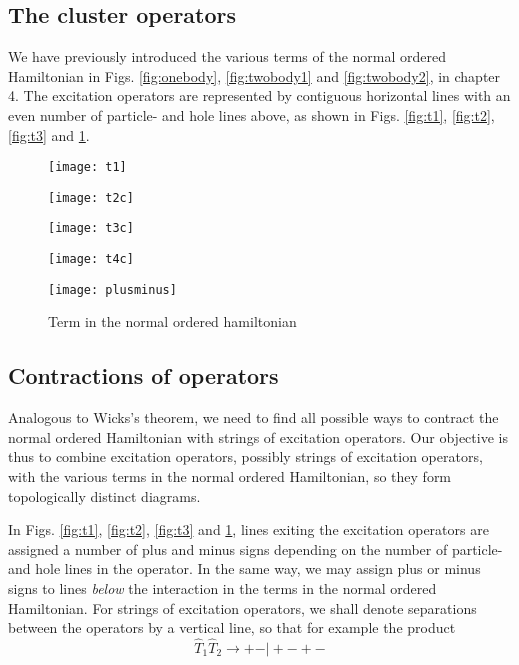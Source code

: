 \subsection{The cluster operators}

We have previously introduced the various terms of the normal ordered
Hamiltonian in Figs. \ref{fig:onebody}, \ref{fig:twobody1} and
\ref{fig:twobody2}, in chapter 4. The excitation operators are
represented by contiguous horizontal lines with an even number of
particle- and hole lines above, as shown in Figs. \ref{fig:t1},
\ref{fig:t2}, \ref{fig:t3} and \ref{fig:t4}.
\begin{figure}[!htb]
  \centering
  \texttt{[image: t1]}
  \caption{}\label{fig:t1}
\endminipage\hfill
{}
  \centering
  \texttt{[image: t2c]}
  \caption{}\label{fig:t2}
\endminipage\hfill
{}
  \centering
  \texttt{[image: t3c]}
  \caption{}\label{fig:t3}
\endminipage\hfill
{}
  \centering
  \texttt{[image: t4c]}
  \caption{}\label{fig:t4}
\endminipage\hfill
\end{figure}

\begin{figure}
 \centering
  \texttt{[image: plusminus]}
  \caption{Term in the normal ordered hamiltonian}\label{fig:plusminus}
\end{figure}

\subsection{Contractions of operators}

Analogous to Wicks's theorem, we need to find all possible ways to
contract the normal ordered Hamiltonian with strings of excitation
operators.  Our objective is thus to combine excitation operators,
possibly strings of excitation operators, with the various terms in
the normal ordered Hamiltonian, so they form topologically distinct
diagrams.

In Figs. \ref{fig:t1}, \ref{fig:t2}, \ref{fig:t3} and
\ref{fig:t4}, lines exiting the excitation operators are assigned a
number of plus and minus signs depending on the number of particle-
and hole lines in the operator. In the same way, we may assign plus or
minus signs to lines \emph{below} the interaction in the terms in the
normal ordered Hamiltonian. For strings of excitation operators, we
shall denote separations between the operators by a vertical line, so
that for example the product
\begin{equation}
\hat{T}_1 \hat{T}_2 \rightarrow + - \vert + - + - 
\label{eqn:exprod}
\end{equation}

